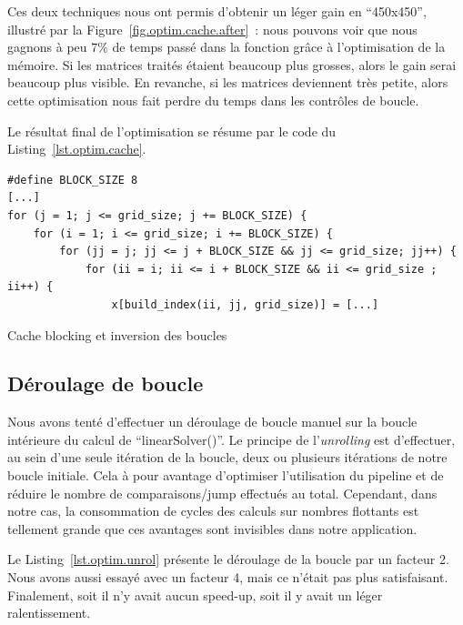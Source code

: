 \documentclass[12pt,a4paper]{article}
\begin{document}
Ces deux techniques nous ont permis d’obtenir un léger gain en
\enquote{450x450}, illustré par la Figure~\ref{fig.optim.cache.after} : nous
pouvons voir que nous gagnons à peu $7\%$ de temps passé dans la fonction grâce
à l’optimisation de la mémoire. Si les matrices traités étaient beaucoup plus
grosses, alors le gain serai beaucoup plus visible. En revanche, si les matrices
deviennent très petite, alors cette optimisation nous fait perdre du temps dans
les contrôles de boucle.

Le résultat final de l’optimisation se résume par le code du Listing~\ref{lst.optim.cache}.
\begin{listing}[h]
    \begin{verbatim}
#define BLOCK_SIZE 8
[...]
for (j = 1; j <= grid_size; j += BLOCK_SIZE) {
    for (i = 1; i <= grid_size; i += BLOCK_SIZE) {
        for (jj = j; jj <= j + BLOCK_SIZE && jj <= grid_size; jj++) {
            for (ii = i; ii <= i + BLOCK_SIZE && ii <= grid_size ; ii++) {
                x[build_index(ii, jj, grid_size)] = [...]
    \end{verbatim}
    \caption{Cache blocking et inversion des boucles}
    \label{lst.optim.cache}
\end{listing}

\subsection{Déroulage de boucle}
\label{sub.optim.unrol}

Nous avons tenté d’effectuer un déroulage de boucle manuel sur la boucle
intérieure du calcul de \enquote{linearSolver()}. Le principe de
l’\textit{unrolling} est d’effectuer, au sein d’une seule itération de la
boucle, deux ou plusieurs itérations de notre boucle initiale. Cela à pour
avantage d’optimiser l’utilisation du pipeline et de réduire le nombre de
comparaisons/jump effectués au total. Cependant, dans notre cas, la consommation
de cycles des calculs sur nombres flottants est tellement grande que ces
avantages sont invisibles dans notre application.

Le Listing~\ref{lst.optim.unrol} présente le déroulage de la boucle par un
facteur 2. Nous avons aussi essayé avec un facteur 4, mais ce n’était pas plus
satisfaisant. Finalement, soit il n’y avait aucun speed-up, soit il y avait un
léger ralentissement.
\end{document}
